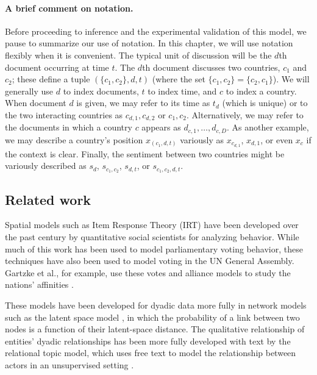 \paragraph{A brief comment on notation.} Before proceeding to
inference and the experimental validation of this model, we pause to
summarize our use of notation.  In this chapter, we will use notation
flexibly when it is convenient.  The typical unit of discussion will
be the $d$th document occurring at time $t$.  The $d$th document
discusses two countries, $c_1$ and $c_2$; these define a tuple $(\{
c_1, c_2 \}, d, t)$ (where the set $\{ c_1, c_2 \} = \{ c_2, c_1 \}$).
We will generally use $d$ to index documents, $t$ to index time, and
$c$ to index a country.  When document $d$ is given, we may refer to
its time as $t_d$ (which is unique) or to the two interacting
countries as $c_{d,1},c_{d,2}$ or $c_1,c_2$.  Alternatively, we may
refer to the documents in which a country $c$ appears as $d_{c,1},
\ldots, d_{c,D}$.  As another example, we may describe a country's
position $x_{(c_1,d,t)}$ variously as $x_{c_{d,1}}$, $x_{d,1}$, or even $x_c$
if the context is clear. Finally, the sentiment between two countries
might be variously described as $s_d$, $s_{c_1,c_2}$, $s_{d,t}$, or
$s_{c_1,c_2,d,t}$.

\subsection{Related work}

Spatial models such as Item Response Theory (IRT) have been developed
over the past century by quantitative social scientists for analyzing
behavior.  While much of this work has been used to model
parliamentary voting behavior, these techniques have also been used to
model voting in the UN General Assembly. Gartzke et al., for example,
use these votes and alliance models to study the nations' affinities
\cite{gartzke:1998}.

These models have been developed for dyadic data more fully in network
models such as the latent space model \cite{hoff:2002,sarkar:2005}, in
which the probability of a link between two nodes is a function of
their latent-space distance.  The qualitative relationship of
entities' dyadic relationships has been more fully developed with text
by the relational topic model, which uses free text to model the
relationship between actors in an unsupervised setting
\cite{chang:2009}.


